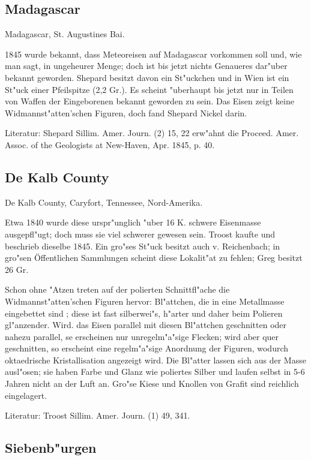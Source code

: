 \documentclass[a4paper, 11pt, oneside]{article}
\begin{document}
\subsection{Madagascar}

Madagascar, St. Augustines Bai.

1845 wurde bekannt, dass Meteoreisen auf Madagascar vorkommen soll und, wie man sagt, in ungeheurer Menge; doch ist bis jetzt nichts Genaueres dar"uber bekannt geworden. Shepard besitzt davon ein St"uckchen und in Wien ist ein St"uck einer Pfeilspitze (2,2 Gr.). Es scheint "uberhaupt bis jetzt nur in Teilen von Waffen der Eingeborenen bekannt geworden zu sein. Das Eisen zeigt keine Widmannst"atten'schen Figuren, doch fand Shepard Nickel darin.

Literatur: Shepard Sillim. Amer. Journ. (2) 15, 22 erw"ahnt die Proceed. Amer. Assoc. of the Geologists at New-Haven, Apr. 1845, p. 40.

\subsection{De Kalb County}

De Kalb County, Caryfort, Tennessee, Nord-Amerika.

Etwa 1840 wurde diese urspr"unglich "uber 16 K. schwere Eisenmasse ausgepfl"ugt; doch muss sie viel schwerer gewesen sein. Troost kaufte und beschrieb dieselbe 1845. Ein gro"ses St"uck besitzt auch v. Reichenbach; in gro"sen Öffentlichen Sammlungen scheint diese Lokalit"at zu fehlen; Greg besitzt 26 Gr.

Schon ohne "Atzen treten auf der polierten Schnittfl"ache die Widmannst"atten'schen Figuren hervor: Bl"attchen, die in eine Metallmasse eingebettet sind ; diese ist fast silberwei"s, h"arter und daher beim Polieren gl"anzender. Wird. das Eisen parallel mit diesen Bl"attchen geschnitten oder nahezu parallel, se erscheinen nur unregelm"a"sige Flecken; wird aber quer geschnitten, so erscheint eine regelm"a"sige Anordnung der Figuren, wodurch oktaedrische Kristallisation angezeigt wird. Die Bl"atter lassen sich aus der Masse ausl"osen; sie haben Farbe und Glanz wie poliertes Silber und laufen selbst in 5-6 Jahren nicht an der Luft an. Gro"se Kiese und Knollen von Grafit sind reichlich eingelagert.

Literatur: Troost Sillim. Amer. Journ. (1) 49, 341.

\subsection{Siebenb"urgen}
\end{document}
